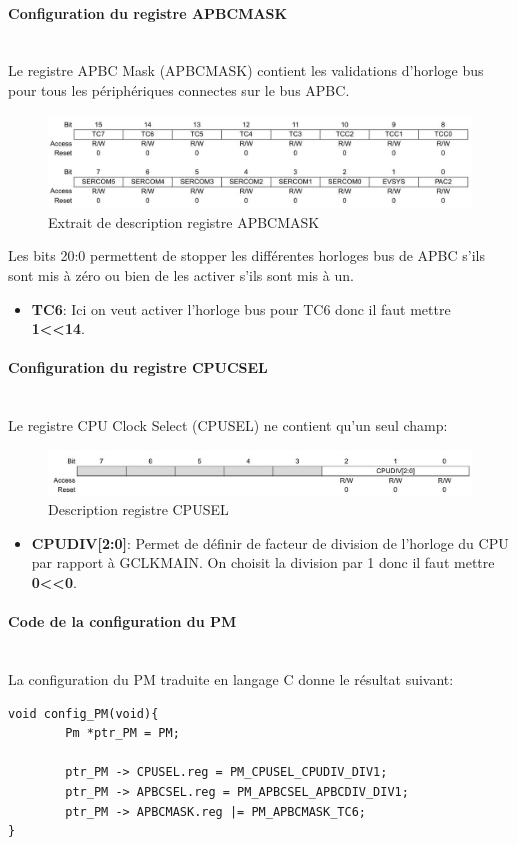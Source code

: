 \documentclass[a4paper]{article}
\begin{document}
	\paragraph{Configuration du registre APBCMASK} 
	~~\\
	Le registre APBC Mask (APBCMASK) contient les validations d'horloge bus pour tous les périphériques connectes sur le bus APBC.
	\begin{figure}[H]
		\centering
		\includegraphics[width=0.9\linewidth]{APBCMASK.jpg}
		\caption{Extrait de description registre APBCMASK}
	\end{figure}
	Les bits 20:0 permettent de stopper les différentes horloges bus de APBC s’ils sont mis à zéro ou bien de les activer s’ils sont mis à un.
	\begin{itemize}
		\item {\bf TC6}: Ici on veut activer l’horloge bus pour TC6 donc il faut mettre {\bf 1\textless\textless14}.~~\\
	\end{itemize}
	
	\paragraph{Configuration du registre CPUCSEL} 
	~~\\
	Le registre CPU Clock Select (CPUSEL) ne contient qu'un seul champ:
	\begin{figure}[H]
		\centering
		\includegraphics[width=0.9\linewidth]{CPUSEL.jpg}
		\caption{Description registre CPUSEL}
	\end{figure}
	\begin{itemize}
		\item {\bf CPUDIV[2:0]}: Permet de définir de facteur de division de l'horloge du CPU par rapport à GCLKMAIN. On choisit la division par 1 donc il faut mettre {\bf 0\textless\textless0}.~~\\
	\end{itemize}
	
	\paragraph{Code de la configuration du PM} ~~\\
	La configuration du PM traduite en langage C donne le résultat suivant:
	\begin{lstlisting}[style=CStyle]
void config_PM(void){
	    Pm *ptr_PM = PM;
	
	    ptr_PM -> CPUSEL.reg = PM_CPUSEL_CPUDIV_DIV1;
	    ptr_PM -> APBCSEL.reg = PM_APBCSEL_APBCDIV_DIV1;
	    ptr_PM -> APBCMASK.reg |= PM_APBCMASK_TC6;
}
	\end{lstlisting}
	
\end{document}
